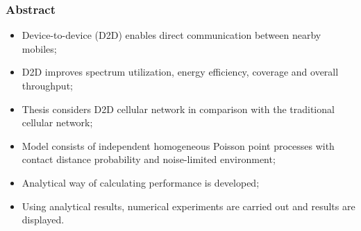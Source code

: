 \begin {frame}
  \frametitle {Abstract}
  \begin{itemize}
    \item Device-to-device (D2D) enables direct communication between nearby mobiles;
    \item D2D improves spectrum utilization, energy efficiency, coverage and overall throughput;
    \item Thesis considers D2D cellular network in comparison with the traditional cellular network;
    \item Model consists of independent homogeneous Poisson point processes with contact distance probability and noise-limited environment;
    \item Analytical way of calculating performance is developed;
    \item Using analytical results, numerical experiments are carried out and results are displayed.
  \end{itemize}
\end {frame}
